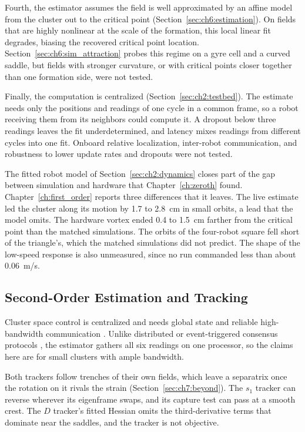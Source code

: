 Fourth, the estimator assumes the field is well approximated by an affine model from the cluster out to the critical point (Section~\ref{sec:ch6:estimation}). On fields that are highly nonlinear at the scale of the formation, this local linear fit degrades, biasing the recovered critical point location. Section~\ref{sec:ch6:sim_attraction} probes this regime on a gyre cell and a curved saddle, but fields with stronger curvature, or with critical points closer together than one formation side, were not tested.

Finally, the computation is centralized (Section~\ref{sec:ch2:testbed}). The estimate needs only the positions and readings of one cycle in a common frame, so a robot receiving them from its neighbors could compute it. A dropout below three readings leaves the fit underdetermined, and latency mixes readings from different cycles into one fit. Onboard relative localization, inter-robot communication, and robustness to lower update rates and dropouts were not tested.

The fitted robot model of Section~\ref{sec:ch2:dynamics} closes part of the
gap between simulation and hardware that Chapter~\ref{ch:zeroth} found.
Chapter~\ref{ch:first_order} reports three differences that it leaves. The
live estimate led the cluster along its motion by 1.7 to 2.8~cm in small
orbits, a lead that the model omits. The hardware vortex ended 0.4 to
1.5~cm farther from the critical point than the matched simulations. The
orbits of the four-robot square fell short of the triangle's, which the
matched simulations did not predict. The shape of the low-speed response
is also unmeasured, since no run commanded less than about 0.06~m/s.

\subsection{Second-Order Estimation and Tracking}
\label{sec:ch9:second_order}

Cluster space control is centralized and needs global state and reliable
high-bandwidth communication \cite{53}. Unlike distributed or
event-triggered consensus protocols \cite{68}, the estimator gathers all six
readings on one processor, so the claims here are for small clusters with
ample bandwidth.

Both trackers follow trenches of their own fields, which leave a
separatrix once the rotation on it rivals the strain
(Section~\ref{sec:ch7:beyond}). The $s_1$ tracker can reverse wherever its
eigenframe swaps, and its capture test can pass at a smooth crest. The
$D$ tracker's fitted Hessian omits the third-derivative terms that
dominate near the saddles, and the tracker is not objective.

